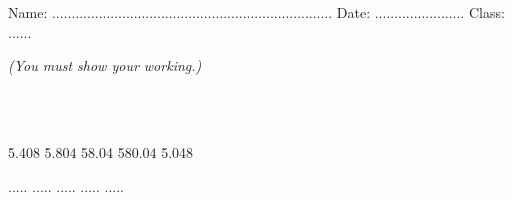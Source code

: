 \documentclass{article}
\date{}
\begin{document}
\fontsize{13}{15} \selectfont %

\begin{center}
  \qquad \\ 
\end{center} \\ 

Name: ........................................................................ \hspace{0.5cm}  Date: ....................... \hspace{0.5cm}  Class: ......

\par
\vspace*{10pt} 
\textit{(You must show your working.)  }
\vspace{10pt}

\hline
\vspace{10pt}

\par
{} \\
\vspace*{20pt}
\par

\begin{flushright}
\end{flushright}
 \vspace{10pt}

\hline
\vspace{10pt}

\par
{} \\

5.408 \hspace{3cm} 5.804  \hspace{3cm} 58.04 \hspace{3cm} 580.04 \hspace{3cm} 5.048 
\vspace{30pt}

 ..... \hspace{3cm} ..... \hspace{3cm}  ..... \hspace{3cm} ..... \hspace{3cm} .....  

\par
{} 
\vspace{10pt}
\end{document}
